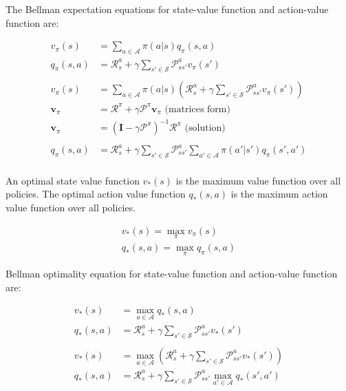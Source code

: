 \noindent The Bellman expectation equations for state-value function and action-value function are:

\begin{align*}
    v_{\pi}(s)       & = \sum_{a \in \mathcal{A}} \pi(a|s) q_\pi(s,a)                                                                                        \\
    q_{\pi}(s, a)    & = \mathcal{R}_s^a + \gamma \sum_{s' \in \mathcal{S}} \mathcal{P}_{ss'}^a v_{\pi}(s')                                                  \\
    \\
    v_{\pi}(s)       & = \sum_{a \in \mathcal{A}} \pi(a|s) \left( \mathcal{R}_s^a + \gamma \sum_{s' \in \mathcal{S}} \mathcal{P}_{ss'}^a v_{\pi}(s') \right) \\
    \mathbf{v}_{\pi} & = \mathcal{R}^{\pi} + \gamma \mathcal{P}^{\pi} \mathbf{v}_{\pi} \text{  (matrices form)}                                              \\
    \mathbf{v}_{\pi} & = (\mathbf{I} - \gamma \mathcal{P}^{\pi})^{-1} \mathcal{R}^{\pi} \text{  (solution)}                                                  \\
    \\
    q_{\pi}(s, a)    & = \mathcal{R}_s^a + \gamma \sum_{s' \in \mathcal{S}} \mathcal{P}_{ss'}^a \sum_{a' \in \mathcal{A}} \pi(a'|s') q_{\pi}(s', a')         \\
\end{align*}

\noindent An optimal state value function $v_*(s)$ is the maximum value function over all
policies. The optimal action value function $q_*(s, a)$ is the maximum action
value function over all policies.

\begin{gather*}
    v_*(s) = \max_{\pi} v_{\pi}(s) \\
    q_*(s, a) = \max_{\pi} q_{\pi}(s, a)
\end{gather*}

\noindent Bellman optimality equation for state-value function and action-value function
are:

\begin{align*}
    v_*(s)    & = \max_{a \in \mathcal{A}} q_*(s, a)                                                                                     \\
    q_*(s, a) & = \mathcal{R}_s^a + \gamma \sum_{s' \in \mathcal{S}} \mathcal{P}_{ss'}^a v_*(s')                                         \\
    \\
    v_*(s)    & = \max_{a \in \mathcal{A}} \left( \mathcal{R}_s^a + \gamma \sum_{s' \in \mathcal{S}} \mathcal{P}_{ss'}^a v_*(s') \right) \\
    q_*(s, a) & = \mathcal{R}_s^a + \gamma \sum_{s' \in \mathcal{S}} \mathcal{P}_{ss'}^a \max_{a' \in \mathcal{A}} q_*(s', a')           \\
\end{align*}